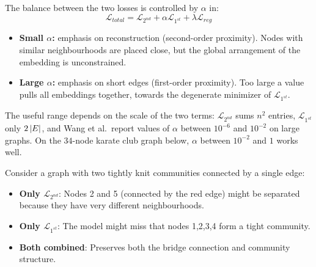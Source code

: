 \begin{notechapter}
The balance between the two losses is controlled by $\alpha$ in:
\[
\mathcal{L}_{total} = \mathcal{L}_{2^{nd}} + \alpha \mathcal{L}_{1^{st}} + \lambda \mathcal{L}_{reg}
\]

\begin{itemize}
    \item \textbf{Small $\alpha$:} emphasis on reconstruction (second-order proximity). Nodes with similar neighbourhoods are placed close, but the global arrangement of the embedding is unconstrained.
    \item \textbf{Large $\alpha$:} emphasis on short edges (first-order proximity). Too large a value pulls all embeddings together, towards the degenerate minimizer of $\mathcal L_{1^{st}}$.
\end{itemize}
The useful range depends on the scale of the two terms: $\mathcal L_{2^{nd}}$ sums $n^2$ entries, $\mathcal L_{1^{st}}$ only $2\left|E\right|$, and Wang et al.\ report values of $\alpha$ between $10^{-6}$ and $10^{-2}$ on large graphs. On the $34$-node karate club graph below, $\alpha$ between $10^{-2}$ and $1$ works well.

\begin{example}
Consider a graph with two tightly knit communities connected by a single edge:

\begin{center}
\end{center}

\begin{itemize}
    \item \textbf{Only $\mathcal{L}_{2^{nd}}$}: Nodes 2 and 5 (connected by the red edge) might be separated because they have very different neighbourhoods.
    \item \textbf{Only $\mathcal{L}_{1^{st}}$}: The model might miss that nodes 1,2,3,4 form a tight community.
    \item \textbf{Both combined}: Preserves both the bridge connection and community structure.
\end{itemize}
\end{example}


\end{notechapter}
